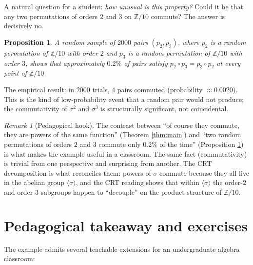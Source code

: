 \documentclass[11pt]{article}
\theoremstyle{plain}
\newtheorem{proposition}[theorem]{Proposition}
\theoremstyle{definition}
\theoremstyle{remark}
\newtheorem*{remark}{Remark}
\begin{document}
A natural question for a student: \emph{how unusual is this property?} Could it be that any two permutations of orders $2$ and $3$ on $\mathbb{Z}/10$ commute? The answer is decisively no.

\begin{proposition}\label{prop:control}
A random sample of $2000$ pairs $(p_2, p_3)$, where $p_2$ is a random permutation of $\mathbb{Z}/10$ with order $2$ and $p_3$ is a random permutation of $\mathbb{Z}/10$ with order $3$, shows that approximately $0.2\%$ of pairs satisfy $p_2 \circ p_3 = p_3 \circ p_2$ at every point of $\mathbb{Z}/10$.
\end{proposition}

The empirical result: in $2000$ trials, $4$ pairs commuted (probability $\approx 0.0020$). This is the kind of low-probability event that a random pair would not produce; the commutativity of $\sigma^2$ and $\sigma^3$ is structurally significant, not coincidental.

\begin{remark}[Pedagogical hook]
The contrast between ``of course they commute, they are powers of the same function'' (Theorem \ref{thm:main}) and ``two random permutations of orders $2$ and $3$ commute only $0.2\%$ of the time'' (Proposition \ref{prop:control}) is what makes the example useful in a classroom. The same fact (commutativity) is trivial from one perspective and surprising from another. The CRT decomposition is what reconciles them: powers of $\sigma$ commute because they all live in the abelian group $\langle \sigma \rangle$, and the CRT reading shows that within $\langle \sigma \rangle$ the order-$2$ and order-$3$ subgroups happen to ``decouple'' on the product structure of $\mathbb{Z}/10$.
\end{remark}

\section{Pedagogical takeaway and exercises}

The example admits several teachable extensions for an undergraduate algebra classroom:
\end{document}
